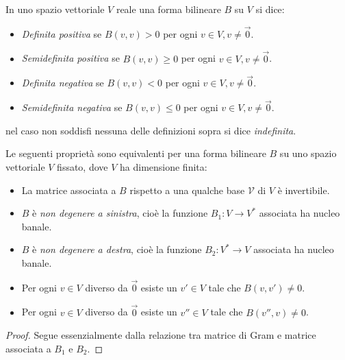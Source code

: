\documentclass[11pt]{scrartcl}
\begin{document}
	\begin{definition}
		In uno spazio vettoriale $V$ reale una forma bilineare $B$ su $V$ si dice:
		\begin{itemize}
			\item \textit{Definita positiva} se $B(v,v)>0$ per ogni $v\in V,v\ne \vec{0}$.
			\item \textit{Semidefinita positiva} se $B(v,v)\ge 0$ per ogni $v\in V,v\ne \vec{0}$.
			\item  \textit{Definita negativa} se $B(v,v)<0$ per ogni $v\in V, v\ne \vec{0}$.
			\item \textit{Semidefinita negativa} se $B(v,v)\le 0$ per ogni $v\in V,v\ne \vec{0}$.
		\end{itemize}
		nel caso non soddisfi nessuna delle definizioni sopra si dice \textit{indefinita}.
	\end{definition}
	\begin{proposition}
		Le seguenti proprietà sono equivalenti per una forma bilineare $B$ su uno spazio vettoriale $V$ fissato, dove $V$ ha dimensione finita:
		\begin{itemize}
			\item La matrice associata a $B$ rispetto a una qualche base $\mathcal{V}$ di $V$ è invertibile.
			\item $B$ è \textit{non degenere a sinistra}, cioè la funzione $B_1:V\to V^*$ associata ha nucleo banale.
			\item $B$ è \textit{non degenere a destra}, cioè la funzione $B_2:V^*\to V$ associata ha nucleo banale.
			\item Per ogni $v\in V$ diverso da $\vec{0}$ esiste un $v'\in V$ tale che
			$B(v,v')\ne 0$.
			\item Per ogni $v\in V$ diverso da $\vec{0}$ esiste un $v''\in V$ tale che
			$B(v'',v)\ne 0$.
		\end{itemize}
	\end{proposition}
	\begin{proof}
		Segue essenzialmente dalla relazione tra matrice di Gram e matrice associata a $B_1$ e $B_2$.
	\end{proof}
	
\end{document}

